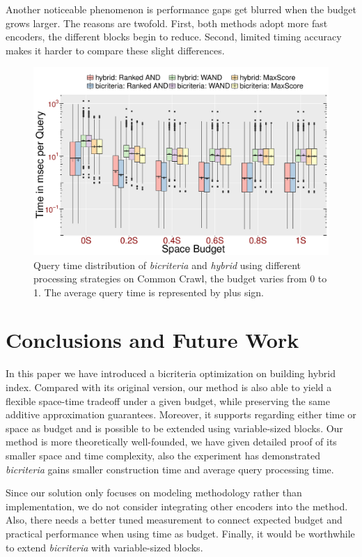 \documentclass{sig-alternate-05-2015}
\begin{document}
Another noticeable phenomenon is performance gaps get blurred when the budget grows larger.
The reasons are twofold.
First, both methods adopt more fast encoders, the different blocks begin to reduce.
Second, limited timing accuracy makes it harder to compare these slight differences.
\begin{figure}
	\centering
	\includegraphics[width=1.0\linewidth]{query}
	\caption{Query time distribution of \textit{bicriteria} and \textit{hybrid} using different processing strategies on Common Crawl, the budget varies from 0 to 1. The average query time is represented by plus sign.}
	\label{fig: query}
\end{figure}

\section{Conclusions and Future Work}
In this paper we have introduced a bicriteria optimization on building hybrid index.
Compared with its original version, our method is also able to yield a flexible space-time tradeoff under a given budget, while preserving the same additive approximation guarantees.
Moreover, it supports regarding either time or space as budget and is possible to be extended using variable-sized blocks.
Our method is more theoretically well-founded, we have given detailed proof of its smaller space and time complexity, also the experiment has demonstrated \textit{bicriteria} gains smaller construction time and average query processing time.

Since our solution only focuses on modeling methodology rather than implementation, we do not consider integrating other encoders into the method.
Also, there needs a better tuned measurement to connect expected budget and practical performance when using time as budget.
Finally, it would be worthwhile to extend \textit{bicriteria} with variable-sized blocks.


\balance


%
\end{document}
